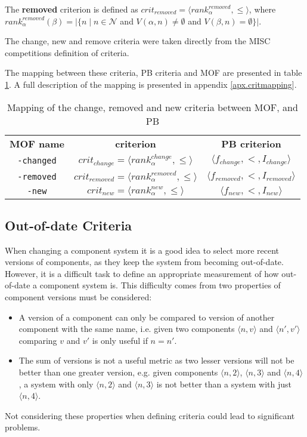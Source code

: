 \begin{defs}
	The \textbf{removed} criterion is defined as $crit_{removed} = \langle rank^{removed}_{\alpha}, \leq \rangle$,
	where $rank^{removed}_{\alpha}(\beta) = |\{n \mid n \in \mathcal{N}$ and $V(\alpha,n) \neq \emptyset$ and $V(\beta,n) =\emptyset\}|$.
\end{defs}

The change, new and remove criteria were taken directly from the MISC competitions definition of criteria.

The mapping between these criteria, PB criteria and MOF are presented in table \ref{impl.ccritmapping}.
A full description of the mapping is presented in appendix \ref{apx.critmapping}.
\begin{table}[h!]
\centering
\begin{tabular}{c | c | c}
\textbf{MOF name} 		& \textbf{\modelname criterion} & \textbf{PB criterion} \\
\texttt{-changed} 	& $crit_{change} = \langle rank^{change}_{\alpha}, \leq \rangle$ & $\langle f_{change}, <, I_{change} \rangle$ \\
\texttt{-removed} 	& $crit_{removed} = \langle rank^{removed}_{\alpha}, \leq \rangle$ & $\langle f_{removed}, <, I_{removed} \rangle$ \\
\texttt{-new} 	& $crit_{new} = \langle rank^{new}_{\alpha}, \leq \rangle$ & $\langle f_{new}, <, I_{new} \rangle$ \\
\end{tabular}
\caption{Mapping of the change, removed and new criteria between MOF, \modelname and PB}
\label{impl.ccritmapping}
\end{table}

\subsection{Out-of-date Criteria}
When changing a component system it is a good idea to select more recent versions of components, as they keep the system from becoming out-of-date.
However, it is a difficult task to define an appropriate measurement of how out-of-date a component system is.
This difficulty comes from two properties of component versions must be considered:
\begin{itemize}
  \item A version of a component can only be compared to version of another component with the same name, 
  i.e. given two components $\langle n,v \rangle$ and  $\langle n',v' \rangle$ comparing $v$ and $v'$ is only useful if $n = n'$.
  \item The sum of versions is not a useful metric as two lesser versions will not be better than one greater version, 
  e.g. given components $\langle n,2 \rangle$,  $\langle n,3 \rangle$ and  $\langle n,4 \rangle$,
  a system with only $\langle n,2 \rangle$ and $\langle n,3 \rangle$ is not better than a system with just $\langle n,4 \rangle$. 
\end{itemize}
Not considering these properties when defining criteria could lead to significant problems.

